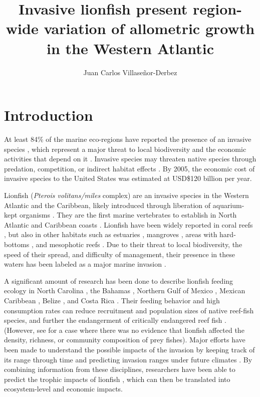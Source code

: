 \documentclass[fleqn,10pt,lineno]{wlpeerj} %
\title{Invasive lionfish present region-wide variation of allometric growth in
the Western Atlantic}
\author[1]{Juan Carlos Villaseñor-Derbez}
\affil[1]{Bren School of Environmental Sciences and Management, University of
California Santa Barbara, Santa Barbara, California, U.S.}
\begin{document}
\flushbottom
\maketitle
\thispagestyle{empty}

\section{Introduction}\label{introduction}

At least 84\% of the marine eco-regions have reported the presence of an
invasive species \citep{molnar_2008}, which represent a major threat to
local biodiversity and the economic activities that depend on it
\citep{bax_2003}. Invasive species may threaten native species through
predation, competition, or indirect habitat effects
\citep{davis_2003, gurevitch_2004}. By 2005, the economic cost of
invasive species to the United States was estimated at USD\$120 billion
per year\citep{pimentel_2005}.

Lionfish (\emph{Pterois volitans/miles} complex) are an invasive species
in the Western Atlantic and the Caribbean, likely introduced through
liberation of aquarium-kept organisms \citep{betancurr_2011}. They are
the first marine vertebrates to establish in North Atlantic
\citep{schofield_2009,schofield_2010} and Caribbean coasts
\citep{sabidoitza_2016}. Lionfish have been widely reported in coral
reefs \citep{aguilarperera_2010}, but also in other habitats such as
estuaries \citep{jud_2011}, mangroves \citep{barbour_2010}, areas with
hard-bottoms \citep{muoz_2011}, and mesophotic reefs
\citep{andradibrown_2017}. Due to their threat to local biodiversity,
the speed of their spread, and difficulty of management, their presence
in these waters has been labeled as a major marine invasion
\citep{hixon_2016}.

A significant amount of research has been done to describe lionfish
feeding ecology in North Carolina \citep{muoz_2011}, the Bahamas
\citep{morris_2009,cote_2013}, Northern Gulf of Mexico
\citep{dahl_2014}, Mexican Caribbean
\citep{valdezmoreno_2012,villaseorderbez_2014}, Belize
\citep{hackerott_2017}, and Costa Rica \citep{sandel_2015}. Their
feeding behavior and high consumption rates can reduce recruitment
\citep{albins_2008} and population sizes \citep{green_2012} of native
reef-fish species, and further the endangerment of critically endangered
reef fish \citep{rocha_2015}. (However, see \citet{hackerott_2017} for a
case where there was no evidence that lionfish affected the density,
richness, or community composition of prey fishes). Major efforts have
been made to understand the possible impacts of the invasion by keeping
track of its range through time \citep{schofield_2009,schofield_2010}
and predicting invasion ranges under future climates
\citep{grieve_2016}. By combining information from these disciplines,
researchers have been able to predict the trophic impacts of lionfish
\citep{ariasgonzalez_2011}, which can then be translated into
ecosystem-level and economic impacts.
\end{document}
